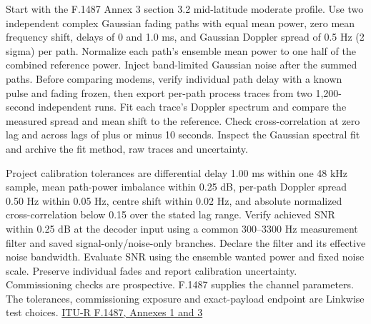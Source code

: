 \documentclass[11pt,a4paper]{article}
\begin{document}
Start with the F.1487 Annex 3 section 3.2 mid-latitude moderate profile. Use two independent complex Gaussian fading paths with equal mean power, zero mean frequency shift, delays of 0 and 1.0 ms, and Gaussian Doppler spread of 0.5 Hz (2 sigma) per path. Normalize each path's ensemble mean power to one half of the combined reference power. Inject band-limited Gaussian noise after the summed paths. Before comparing modems, verify individual path delay with a known pulse and fading frozen, then export per-path process traces from two 1,200-second independent runs. Fit each trace's Doppler spectrum and compare the measured spread and mean shift to the reference. Check cross-correlation at zero lag and across lags of plus or minus 10 seconds. Inspect the Gaussian spectral fit and archive the fit method, raw traces and uncertainty.

Project calibration tolerances are differential delay 1.00 ms within one 48 kHz sample, mean path-power imbalance within 0.25 dB, per-path Doppler spread 0.50 Hz within 0.05 Hz, centre shift within 0.02 Hz, and absolute normalized cross-correlation below 0.15 over the stated lag range. Verify achieved SNR within 0.25 dB at the decoder input using a common 300--3300 Hz measurement filter and saved signal-only/noise-only branches. Declare the filter and its effective noise bandwidth. Evaluate SNR using the ensemble wanted power and fixed noise scale. Preserve individual fades and report calibration uncertainty. Commissioning checks are prospective. F.1487 supplies the channel parameters. The tolerances, commissioning exposure and exact-payload endpoint are Linkwise test choices. \href{https://www.itu.int/dms_pubrec/itu-r/rec/f/R-REC-F.1487-0-200005-I!!PDF-E.pdf}{ITU-R F.1487, Annexes 1 and 3}
\end{document}
